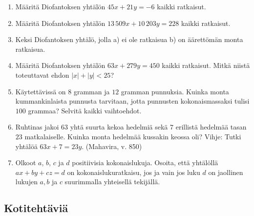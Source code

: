 \begin{enumerate}
\item Määritä Diofantoksen yhtälön $45x + 21y = -6$ kaikki ratkaisut.

\item Määritä Diofantoksen yhtälön $13\, 509x + 10\, 203y = 228$ kaikki ratkaisut.

\item Keksi Diofantoksen yhtälö, jolla a) ei ole ratkaisua b) on äärettömän monta ratkaisua.

\item Määritä Diofantoksen yhtälön $63x + 279y = 450$ kaikki ratkaisut. Mitkä niistä toteuttavat ehdon $|x| + |y| < 25$?

\item Käytettävissä on $8$ gramman ja $12$ gramman punnuksia. Kuinka monta kummankinlaista punnusta tarvitaan, jotta punnusten kokonaismassaksi tulisi $100$ grammaa? Selvitä kaikki vaihtoehdot. 

\item Ruhtinas jakoi $63$ yhtä suurta kekoa hedelmiä sekä $7$ erillistä hedelmää tasan $23$ matkalaiselle. Kuinka monta hedelmää kussakin keossa oli? Vihje: Tutki yhtälöä $63x + 7 = 23y$. (Mahavira, v. 850)

\item Olkoot $a$, $b$, $c$ ja $d$ positiivisia kokonaislukuja. Osoita, että yhtälöllä $ax+by+cz=d$ on kokonaislukuratkaisu, jos ja vain jos luku $d$ on jaollinen lukujen $a,b$ ja $c$ suurimmalla yhteisellä tekijällä. 

\end{enumerate}

\subsection*{Kotitehtäviä}

